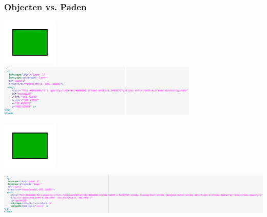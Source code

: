 \documentclass[t]{beamer}
\begin{document}
	\begin{frame}
		\frametitle{Objecten vs. Paden}
		
		\vspace{-0.5cm}
		\hfill \includegraphics[width=0.2\textwidth]{fig/rechthoek_object}\\
		\vspace{-0.3cm}
		\includegraphics[height=2.5cm]{fig/rechthoek_object_bron.png}
		
		\hfill \includegraphics[width=0.2\textwidth]{fig/rechthoek_pad}\\
		\vspace{-0.3cm}
		\includegraphics[height=2.5cm]{fig/rechthoek_pad_bron.png}	
	\end{frame}
\end{document}
